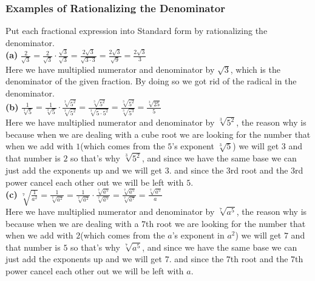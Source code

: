 \subsubsection{Examples of Rationalizing the Denominator}
Put each fractional expression into Standard form by rationalizing the denominator. \\
\textbf{(a)} $\displaystyle \frac{2}{\sqrt{3}}=\frac{2}{\sqrt{3}} \cdot \frac{\sqrt{3}}{\sqrt{3}}=\frac{2\sqrt{3}}{\sqrt{3\cdot3}}=\frac{2\sqrt{3}}{\sqrt{9}}=\frac{2\sqrt{3}}{3}$ \\ 
Here we have multiplied numerator and denominator by $\sqrt{3}$, which is the denominator of the given fraction. By doing so we got rid of the radical in the denominator. \\
\textbf{(b)} $\displaystyle \frac{1}{\sqrt[3]{5}}=\frac{1}{\sqrt[3]{5}} \cdot \frac{\sqrt[3]{5^2}}{\sqrt[3]{5^2}}=\frac{\sqrt[3]{5^2}}{\sqrt[3]{5\cdot5^2}}=\frac{\sqrt[3]{5^2}}{\sqrt[3]{5^3}}=\frac{\sqrt[3]{25}}{5}$ \\
Here we have multiplied numerator and denominator by $\sqrt[3]{5^2}$, the reason why is because when we are dealing with a cube root we are looking for the number that when we add with $ 1 $(which comes from the $5$'s exponent  $\sqrt[3]{5}$) we will get $ 3 $ and that number is $ 2 $ so that's why $\sqrt[3]{5^2}$, and since we have the same base we can just add the exponents up and we will get $ 3 $. and since the $ 3 $rd root and the $ 3 $rd power cancel each other out we will be left with $ 5 $. \\
\textbf{(c)} $\displaystyle \sqrt[7]{\frac{1}{a^2}} = \frac{1}{\sqrt[7]{a^2}} = \frac{1}{\sqrt[7]{a^2}} \cdot \frac{\sqrt[7]{a^5}}{\sqrt[7]{a^5}} = \frac{\sqrt[7]{a^5}}{\sqrt[7]{a^7}} = \frac{\sqrt[7]{a^5}}{a}$ \\
Here we have multiplied numerator and denominator by $\sqrt[7]{a^5}$, the reason why is because when we are dealing with a $ 7 $th root we are looking for the number that when we add with $ 2 $(which comes from the $a$'s exponent in $a^2$) we will get $ 7 $ and that number is $ 5 $ so that's why $\sqrt[7]{a^5}$, and since we have the same base we can just add the exponents up and we will get $ 7 $. and since the $ 7 $th root and the $ 7 $th power cancel each other out we will be left with $ a $. \\